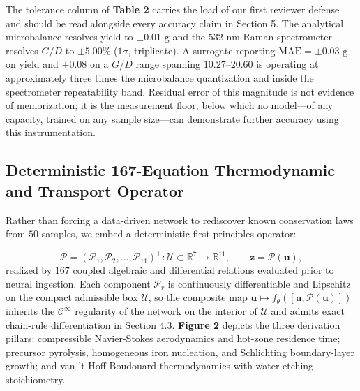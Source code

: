 \documentclass[10pt,journal,onecolumn]{IEEEtran}
\begin{document}
The tolerance column of \textbf{Table 2} carries the load of our first reviewer defense and should be read alongside every accuracy claim in Section 5. The analytical microbalance resolves yield to $\pm 0.01\text{ g}$ and the $532\text{ nm}$ Raman spectrometer resolves $G/D$ to $\pm 5.00\%$ ($1\sigma$, triplicate). A surrogate reporting $\text{MAE} = \pm 0.03\text{ g}$ on yield and $\pm 0.08$ on a $G/D$ range spanning $10.27\text{--}20.60$ is operating at approximately three times the microbalance quantization and inside the spectrometer repeatability band. Residual error of this magnitude is not evidence of memorization; it is the measurement floor, below which no model—of any capacity, trained on any sample size—can demonstrate further accuracy using this instrumentation.

\subsection{Deterministic 167-Equation Thermodynamic and Transport Operator}
Rather than forcing a data-driven network to rediscover known conservation laws from $50$ samples, we embed a deterministic first-principles operator:

\begin{equation}
\mathcal{P} = (\mathcal{P}_1, \mathcal{P}_2, \dots, \mathcal{P}_{11})^\top : \mathcal{U} \subset \mathbb{R}^7 \longrightarrow \mathbb{R}^{11}, \qquad \mathbf{z} = \mathcal{P}(\mathbf{u}),
\end{equation}
realized by $167$ coupled algebraic and differential relations evaluated prior to neural ingestion. Each component $\mathcal{P}_r$ is continuously differentiable and Lipschitz on the compact admissible box $\mathcal{U}$, so the composite map $\mathbf{u} \mapsto f_\theta([\mathbf{u}, \mathcal{P}(\mathbf{u})])$ inherits the $\mathcal{C}^\infty$ regularity of the network on the interior of $\mathcal{U}$ and admits exact chain-rule differentiation in Section 4.3. \textbf{Figure 2} depicts the three derivation pillars: compressible Navier-Stokes aerodynamics and hot-zone residence time; precursor pyrolysis, homogeneous iron nucleation, and Schlichting boundary-layer growth; and van 't Hoff Boudouard thermodynamics with water-etching stoichiometry.
\end{document}

